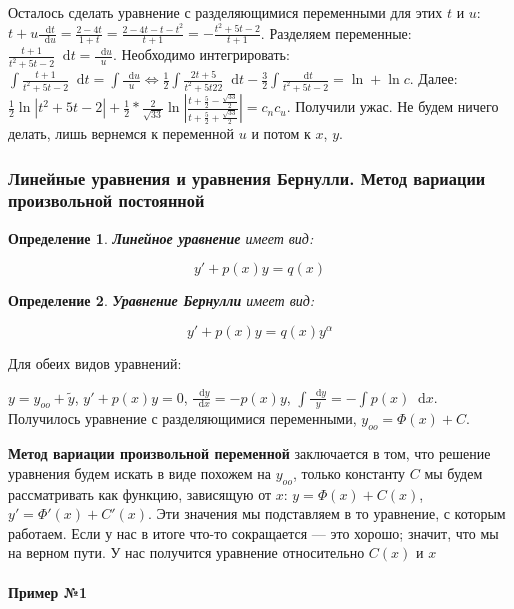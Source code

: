 \documentclass{article}
\newcommand*\diff{\mathop{}\!\mathrm{d}}
\newtheorem{definition}{Определение}
\begin{document}
\begin{enumerate}
    Осталось сделать уравнение с разделяющимися переменными для этих $t$ и $u$: $t + u \frac{\diff t}{\diff u} = \frac{2 - 4t}{1 + t} = \frac{2 - 4t - t - t^2}{t + 1} = - \frac{t^2 + 5t - 2}{t + 1}$. Разделяем переменные: $\frac{t + 1}{t^2 + 5t - 2} \diff t = \frac{\diff u}{u}$. Необходимо интегрировать:  $\int \frac{t + 1}{t^2 + 5t - 2} \diff t = \int \frac{\diff u}{u} \Longleftrightarrow \frac{1}{2} \int \frac{2 t + 5}{t^2 + 5t 2 2} \diff t - \frac{3}{2} \int \frac{\diff t}{t^2 + 5t - 2} = \ln + \ln c$. Далее: $\frac{1}{2} \ln |t^2 + 5t - 2| + \frac{1}{2} * \frac{2}{\sqrt{33}} \ln |\frac{t + \frac{5}{2} - \frac{\sqrt{33}}{2}}{t + \frac{5}{2} + \frac{\sqrt{33}}{2}}| = c_n c_u$. Получили ужас. Не будем ничего делать, лишь вернемся к переменной $u$ и потом к $x$, $y$.
\end{enumerate}

\subsubsection{Линейные уравнения и уравнения Бернулли. Метод вариации произвольной постоянной}

\begin{definition}{\textbf{Линейное уравнение}}
    имеет вид:

    $$y' + p(x)y = q(x)$$
\end{definition}

\begin{definition}{\textbf{Уравнение Бернулли}}
    имеет вид:

    $$y' + p(x)y = q(x) y^{\alpha}$$
\end{definition}

Для обеих видов уравнений:

$y = y_{oo} + \tilde{y}$, $y' + p(x) y = 0$, $\frac{\diff y}{\diff x} = -p(x) y$, $\int \frac{\diff y}{y} = - \int p(x) \diff x$. Получилось уравнение с разделяющимися переменными, $y_{oo} = \Phi(x) + C$.

\textbf{Метод вариации произвольной переменной} заключается в том, что решение уравнения будем искать в виде похожем на $y_{oo}$, только константу $C$ мы будем рассматривать как функцию, зависящую от $x$: $y = \Phi(x) + C(x)$, $y' = \Phi'(x) + C'(x)$. Эти значения мы подставляем в то уравнение, с которым работаем. Если у нас в итоге что-то сокращается — это хорошо; значит, что мы на верном пути. У нас получится уравнение относительно $C(x)$ и $x$

\paragraph{Пример №1}
\end{document}
